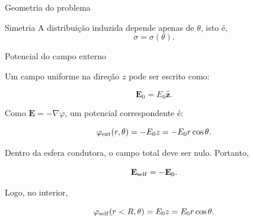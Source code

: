 \documentclass[aspectratio=169]{beamer}
\begin{document}
\begin{frame}{Geometria do problema}

\begin{center}
\end{center}

\begin{mybox}{Simetria}
A distribuição induzida depende apenas de \(\theta\), isto é,
\[
\sigma=\sigma(\theta).
\]
\end{mybox}

\end{frame}

\begin{frame}{Potencial do campo externo}

\small

Um campo uniforme na direção \(z\) pode ser escrito como:

\[
\mathbf E_0=E_0\hat{\mathbf z}.
\]

Como \(\mathbf E=-\nabla\varphi\), um potencial correspondente é:

\begin{eqbox}
\begin{equation}
\varphi_{\rm ext}(r,\theta)
=
-E_0 z
=
-E_0 r\cos\theta.
\label{eq:potencial-externo-uniforme}
\end{equation}
\end{eqbox}

Dentro da esfera condutora, o campo total deve ser nulo. Portanto,

\[
\mathbf E_{\rm self}=-\mathbf E_0.
\]

Logo, no interior,

\begin{eqbox}
\begin{equation}
\varphi_{\rm self}(r<R,\theta)
=
E_0 z
=
E_0 r\cos\theta.
\label{eq:potencial-self-interior}
\end{equation}
\end{eqbox}

\end{frame}
\end{document}
